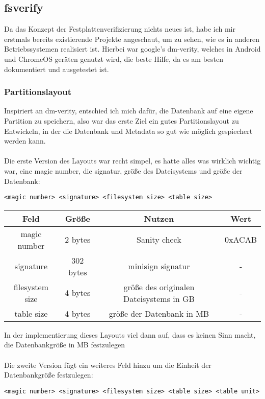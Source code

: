 \subsection{fsverify}
Da das Konzept der Festplattenverifizierung nichts neues ist, habe ich mir erstmals bereits existierende Projekte angeschaut, um zu sehen, wie es in anderen Betriebssystemen realisiert ist.
Hierbei war google's dm-verity, welches in Android und ChromeOS geräten genutzt wird, die beste Hilfe, da es am besten dokumentiert und ausgetestet ist.

\subsubsection{Partitionslayout}
Inspiriert an dm-verity, entschied ich mich dafür, die Datenbank auf eine eigene Partition zu speichern, also war das erste Ziel ein gutes Partitionslayout zu Entwickeln, in der die Datenbank und Metadata so gut wie möglich gespiechert werden kann.
\\
\\
Die erste Version des Layouts war recht simpel, es hatte alles was wirklich wichtig war, eine magic number, die signatur, größe des Dateisystems und größe der Datenbank:
\begin{verbatim}
<magic number> <signature> <filesystem size> <table size>
\end{verbatim}

\begin{center}
  \begin{tabular}{|c | c | c | c|}
    \hline
    Feld & Größe & Nutzen & Wert \\ [0.5ex]
    \hline
    magic number & 2 bytes & Sanity check & 0xACAB \\
    \hline
    signature & 302 bytes & minisign signatur & - \\
    \hline
    filesystem size & 4 bytes & größe des originalen Dateisystems in GB & - \\
    \hline
    table size & 4 bytes & größe der Datenbank in MB & - \\
    \hline
  \end{tabular}
\end{center}
In der implementierung dieses Layouts viel dann auf, dass es keinen Sinn macht, die Datenbankgröße in MB festzulegen
\\
\\
Die zweite Version fügt ein weiteres Feld hinzu um die Einheit der Datenbankgröße festzulegen:
\begin{verbatim}
<magic number> <signature> <filesystem size> <table size> <table unit>
\end{verbatim}


